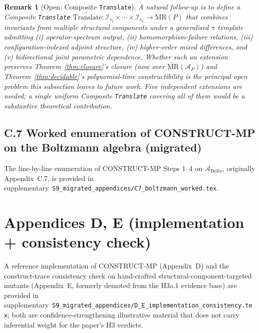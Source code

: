 \documentclass[acmsmall,screen,review]{acmart}
\newtheorem{remark}{Remark}
\begin{document}
\begin{remark}[Open: Composite \texttt{Translate}]
\label{rem:composite-translate}
A natural follow-up is to define a \emph{Composite \texttt{Translate}} $\widetilde{\mathrm{Translate}}: \mathcal{I}_{s_{1}} \times \cdots \times \mathcal{I}_{s_{k}} \to \mathrm{MR}(P)$ that combines invariants from multiple structural components under a generalised $\pi$ template admitting (i) operator-spectrum output, (ii) homomorphism-failure relations, (iii) configuration-indexed adjoint structure, (iv) higher-order mixed differences, and (v) bidirectional joint parametric dependence. Whether such an extension preserves Theorem~\ref{thm:closure}'s closure (now over $\widetilde{\mathrm{MR}}(\mathcal{A}_{P})$) and Theorem~\ref{thm:decidable}'s polynomial-time constructibility is the principal open problem this subsection leaves to future work. Five independent extensions are needed; a single uniform Composite \texttt{Translate} covering all of them would be a substantive theoretical contribution.
\end{remark}

\subsection*{C.7 Worked enumeration of CONSTRUCT-MP on the Boltzmann algebra (migrated)}
\label{app:moved-C7}
The line-by-line enumeration of CONSTRUCT-MP Steps 1--4 on $\mathcal{A}_{\mathrm{Boltz}}$, originally Appendix~C.7, is provided in supplementary~\texttt{S9\_migrated\_appendices/C7\_boltzmann\_worked.tex}.

\section*{Appendices D, E (implementation + consistency check)}
\label{app:moved-D-E}
A reference implementation of CONSTRUCT-MP (Appendix~D) and the construct-trace consistency check on hand-crafted structural-component-targeted mutants (Appendix~E, formerly demoted from the H3a.1 evidence base) are provided in supplementary~\texttt{S9\_migrated\_appendices/D\_E\_implementation\_consistency.tex}; both are confidence-strengthening illustrative material that does not carry inferential weight for the paper's H3 verdicts.
\end{document}
